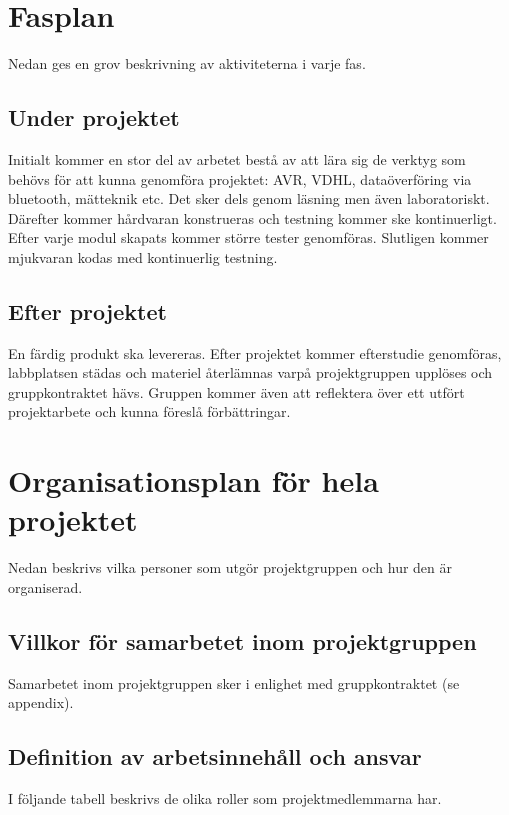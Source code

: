 \documentclass[11pt]{article}
\begin{document}
\begin{flushleft}
\section{Fasplan}
Nedan ges en grov beskrivning av aktiviteterna i varje fas.
\subsection{Under projektet}
Initialt kommer en stor del av arbetet bestå av att lära sig de verktyg som behövs för att kunna genomföra projektet: AVR, VDHL, dataöverföring via bluetooth, mätteknik etc. Det sker dels genom läsning men även laboratoriskt. Därefter kommer hårdvaran konstrueras och testning kommer ske kontinuerligt. Efter varje modul skapats kommer större tester genomföras. Slutligen kommer mjukvaran kodas med kontinuerlig testning.

\subsection{Efter projektet}
En färdig produkt ska levereras. Efter projektet kommer efterstudie genomföras, labbplatsen städas och materiel återlämnas varpå projektgruppen upplöses och gruppkontraktet hävs. Gruppen kommer även att reflektera över ett utfört projektarbete och kunna föreslå förbättringar.
\pagebreak

\section{Organisationsplan för hela projektet}
Nedan beskrivs vilka personer som utgör projektgruppen och hur den är organiserad.

\subsection{Villkor för samarbetet inom projektgruppen}
Samarbetet inom projektgruppen sker i enlighet med gruppkontraktet (se appendix).

\subsection{Definition av arbetsinnehåll och ansvar}
I följande tabell beskrivs de olika roller som projektmedlemmarna har.


\end{flushleft}
\end{document}
